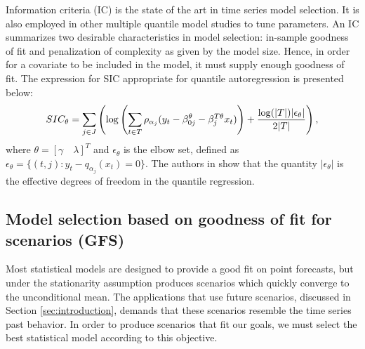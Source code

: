 Information criteria (IC) is the state of the art in time series model selection. It is also employed in other multiple quantile model studies \cite{zou_regularized_2008, jiang_interquantile_2014} to tune parameters.
An IC summarizes two desirable characteristics in model selection: in-sample goodness of fit and penalization of complexity as given by the model size. Hence, in order for a covariate to be included in the model, it must supply enough goodness of fit. The expression for SIC appropriate for quantile autoregression is presented below:
 \begin{equation} 
\small
SIC_\theta = \sum_{j \in J} \left( \log \left(\sum_{t \in T}\rho_{\alpha_j}(y_t - \beta_{0j}^\theta - \beta_j^{T\theta} x_t) \right) +  \frac{\log(|T|)|\epsilon_\theta|}{2|T|}  \right),\label{eq:SIC}
\end{equation}
where $\theta = [\gamma \quad \lambda]^T$ and $\epsilon_\theta$ is the elbow set, defined as $\epsilon_\theta = \{(t,j): y_t - q_{\alpha_j}(x_t) = 0 \}$. The authors in \cite{li_l1-norm_2008} show that the quantity $|\epsilon_\theta|$ is the effective degrees of freedom in the quantile regression.


\subsection{Model selection based on goodness of fit for scenarios (GFS)} \label{sec:GFS}

Most statistical models are designed to provide a good fit on point forecasts, but under the stationarity assumption produces scenarios which quickly converge to the unconditional mean.
The applications that use future scenarios, discussed in Section \ref{sec:introduction}, demands that these scenarios resemble the time series past behavior.
In order to produce scenarios that fit our goals, we must select the best statistical model according to this objective. 

